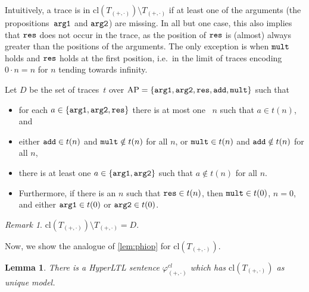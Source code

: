 \documentclass[dvipsnames,10pt,a4paper]{amsart}
\newtheorem{lem}[thm]{Lemma}
\theoremstyle{definition}
\theoremstyle{remark}
\newtheorem{rem}[thm]{Remark}
\newcommand{\set}[1]{\{#1\}}
\newcommand{\hyltl}{{HyperLTL}\xspace}
\newcommand\AP{\textup{AP}}
\newcommand\argl{\textup{\texttt{arg1}}}
\newcommand\argr{\textup{\texttt{arg2}}}
\newcommand\res{\textup{\texttt{res}}}
\newcommand\add{\textup{\texttt{add}}}
\newcommand\mult{\textup{\texttt{mult}}}
\newcommand\phiop{\varphi_{({+},{\cdot})}}
\newcommand\Top{T_{({+},{\cdot})}}
\newcommand{\closure}[1]{\mathrm{cl}(#1)}
\newcommand{\phiopc}{\phiop^{cl}}
\newcommand{\diff}{D}
\begin{document}
Intuitively, a trace is in $\closure{\Top} \setminus \Top$ if at least one of the arguments (the propositions~$\argl$ and $\argr$) are missing. 
In all but one case, this also implies that $\res$ does not occur in the trace, as the position of $\res$ is (almost) always greater than the positions of the arguments. 
The only exception is when $\mult$ holds and $\res$ holds at the first position, i.e.\ in the limit of traces encoding $0\cdot n = n$ for $n$ tending towards infinity.

Let $\diff$ be the set of traces~$t$ over $\AP = \{\argl,\argr,\res,\add,\mult\}$ such that
\begin{itemize}
    \item for each $a \in \set{\argl,\argr,\res}$ there is at most one	~$n$ such that $a \in t(n)$, and
	\item either $\add \in t(n)$ and $\mult \notin t(n)$  for all $n$,
    or $\mult \in t(n)$ and $\add \notin t(n)$  for all $n$, 
    \item there is at least one $a \in \set{\argl,\argr}$  such that $a \notin t(n)$ for all $n$.
    \item Furthermore, if there is an $n$ such that $\res \in t(n)$, then $\mult \in t(0)$, $n = 0$, and either $\argl\in t(0)$ or $\argr\in t(0)$. 
\end{itemize}

\begin{rem}
$\closure{\Top} \setminus \Top = D$.	
\end{rem}

Now, we show the analogue of \autoref{lem:phiop} for $\closure{\Top}$.

\begin{lem}\label{lem:phiopc}
  There is a \hyltl sentence $\phiopc$ which has $\closure{\Top}$ as unique model.
\end{lem}
\end{document}

